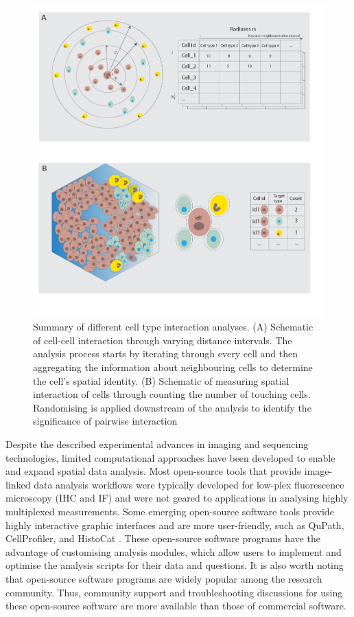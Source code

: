 \begin{figure}
    \centering
    \includegraphics[width=0.85\columnwidth]{Chapter3/Figures/Conceptualise_CCC_analysis_cropped-01.png}
    \caption[Summary of different cell type interaction analyses.]{Summary of different cell type interaction analyses. (A) Schematic of cell-cell interaction through varying distance intervals. The analysis process starts by iterating through every cell and then aggregating the information about neighbouring cells to determine the cell's spatial identity. (B) Schematic of measuring spatial interaction of cells through counting the number of touching cells. Randomising is applied downstream of the analysis to identify the significance of pairwise interaction}
    \label{fig:CCC_conceptualised}
\end{figure}

Despite the described experimental advances in imaging and sequencing technologies, limited computational approaches have been developed to enable and expand spatial data analysis. Most open-source tools that provide image-linked data analysis workflows were typically developed for low-plex fluorescence microscopy (\ie IHC and IF) and were not geared to applications in analysing highly multiplexed measurements. Some emerging open-source software tools provide highly interactive graphic interfaces and are more user-friendly, such as QuPath, CellProfiler, and HistoCat \cite{bankhead2017qupath, carpenter2006cellprofiler, schapiro2017histocat}. These open-source software programs have the advantage of customising analysis modules, which allow users to implement and optimise the analysis scripts for their data and questions. It is also worth noting that open-source software programs are widely popular among the research community. Thus, community support and troubleshooting discussions for using these open-source software are more available than those of commercial software. 

